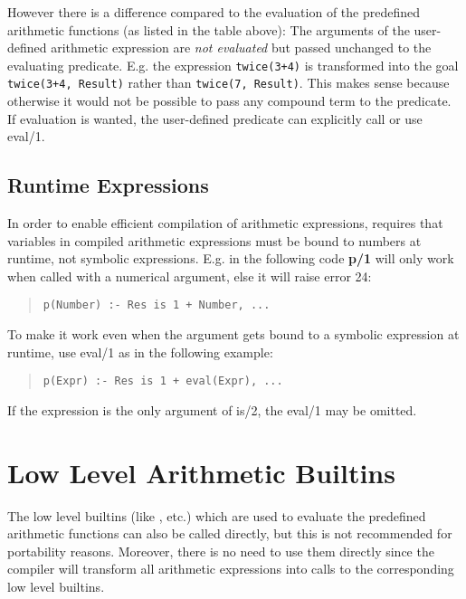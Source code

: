 However there is a difference compared to the evaluation of the predefined
arithmetic functions (as listed in the table above):
The arguments of the user-defined arithmetic expression are {\it not
evaluated} but passed unchanged to the evaluating predicate.
E.g. the expression {\tt twice(3+4)} is transformed into the goal
{\tt twice(3+4, Result)} rather than {\tt twice(7, Result)}.
This makes sense because otherwise it would not be possible to pass
any compound term to the predicate.
If evaluation is wanted, the user-defined predicate can explicitly call
 or use eval/1.

\subsection{Runtime Expressions}
In order to enable efficient compilation of arithmetic expressions,
{\eclipse} requires that variables in compiled arithmetic expressions
must be bound to numbers at runtime, not symbolic expressions.
E.g. in the following code {\bf p/1} will only work when called with a
numerical argument, else it will raise error 24:
\begin{quote}\begin{verbatim}
p(Number) :- Res is 1 + Number, ...
\end{verbatim}\end{quote}
To make it work even when the argument gets bound to a symbolic expression
at runtime, use eval/1 as in the following example:
\begin{quote}\begin{verbatim}
p(Expr) :- Res is 1 + eval(Expr), ...
\end{verbatim}\end{quote}
If the expression is the only argument of is/2, the eval/1 may be omitted.


\section{Low Level Arithmetic Builtins}
The low level builtins (like ,  etc.)
which are used to evaluate
the predefined arithmetic functions can also be called directly,
but this is not recommended for portability reasons.
Moreover, there is no need to use them directly since the {\eclipse} compiler
will transform all arithmetic expressions into calls to the corresponding
low level builtins.

